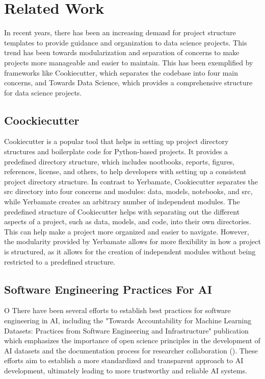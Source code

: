 \section{Related Work}

In recent years, there has been an increasing demand for project structure templates to provide guidance and organization to data science projects. This trend has been towards modularization and separation of concerns to make projects more manageable and easier to maintain. This has been exemplified by frameworks like Cookiecutter, which separates the codebase into four main concerns, and Towards Data Science, which provides a comprehensive structure for data science projects. 

\subsection{Coockiecutter}
Cookiecutter is a popular tool that helps in setting up project directory structures and boilerplate code for Python-based projects. It provides a predefined directory structure, which includes nootbooks, reports, figures, references, license, and others, to help developers with setting up a consistent project directory structure. In contrast to Yerbamate, Cookiecutter separates the src directory into four concerns and modules: data, models, notebooks, and src, while Yerbamate creates an arbitrary number of independent modules. The predefined structure of Cookiecutter helps with separating out the different aspects of a project, such as data, models, and code, into their own directories. This can help make a project more organized and easier to navigate. However, the modularity provided by Yerbamate allows for more flexibility in how a project is structured, as it allows for the creation of independent modules without being restricted to a predefined structure.




\subsection{Software Engineering Practices For AI}


O
There have been several efforts to establish best practices for software engineering in AI, including the "Towards Accountability for Machine Learning Datasets: Practices from Software Engineering and Infrastructure" publication which emphasizes the importance of open science principles in the development of AI datasets and the documentation process for researcher collaboration (\cite{accountabilityInAi}). These efforts aim to establish a more standardized and transparent approach to AI development, ultimately leading to more trustworthy and reliable AI systems.
